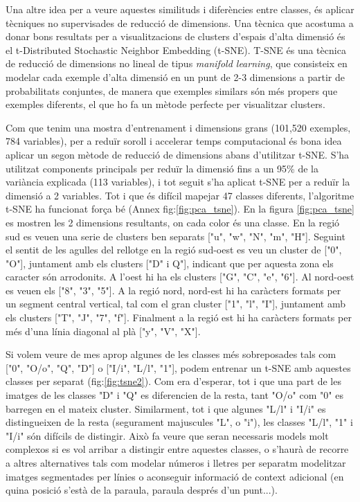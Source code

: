 \documentclass[12pt, spanish]{article}
\begin{document}
Una altre idea per a veure aquestes similituds i diferències entre classes, és aplicar tècniques no supervisades de reducció de dimensions. Una tècnica que acostuma a donar bons resultats per a visualitzacions de clusters d'espais d'alta dimensió és el t-Distributed Stochastic Neighbor Embedding (t-SNE). T-SNE és una tècnica de reducció de dimensions no lineal de tipus \textit{manifold learning}, que consisteix en modelar cada exemple d'alta dimensió en un punt de 2-3 dimensions a partir de probabilitats conjuntes, de manera que exemples similars són més propers que exemples diferents, el que ho fa un mètode perfecte per visualitzar clusters.

Com que tenim una mostra d'entrenament i dimensions grans (101,520 exemples, 784 variables), per a reduïr soroll i accelerar temps computacional és bona idea aplicar un segon mètode de reducció de dimensions abans d'utilitzar t-SNE. S'ha utilitzat components principals per reduïr la dimensió fins a un 95\% de la variància explicada (113 variables), i tot seguit s'ha aplicat t-SNE per a reduïr la dimensió a 2 variables. Tot i que és difícil mapejar 47 classes diferents, l'algoritme t-SNE ha funcionat força bé (Annex fig:\ref{fig:pca_tsne}). En la figura \ref{fig:pca_tsne} es mostren les 2 dimensions resultants, on cada color és una classe. En la regió sud es veuen una serie de clusters ben separats ["u", "w", "N", "m", "H"]. Seguint el sentit de les agulles del rellotge en la regió sud-oest es veu un cluster de ["0", "O"], juntament amb els clusters ["D" i Q"], indicant que per aquesta zona els caracter són arrodonits. A l'oest hi ha els clusters ["G", "C", "e", "6"]. Al nord-oest es veuen els ["8", "3", "5"]. A la regió nord, nord-est hi ha caràcters formats per un segment central vertical, tal com el gran cluster ["1", "l", "I"], juntament amb els clusters ["T", "J", "7", "f"]. Finalment a la regió est hi ha caràcters formats per més d'una línia diagonal al plà ["y", "V", "X"]. 

Si volem veure de mes aprop algunes de les classes més sobreposades tals com ["0", "O/o", "Q", "D"] o ["I/i", "L/l", "1"], podem entrenar un t-SNE amb aquestes classes per separat (fig:\ref{fig:tsne2}). Com era d'esperar, tot i que una part de les imatges de les classes "D" i "Q" es diferencien de la resta, tant "O/o" com "0" es barregen en el mateix cluster. Similarment, tot i que algunes "L/l" i "I/i" es distingueixen de la resta (segurament majuscules "L", o "i"), les classes "L/l", "1" i "I/i" són difícils de distingir. Això fa veure que seran necessaris models molt complexos si es vol arribar a distingir entre aquestes classes, o s'haurà de recorre a altres alternatives tals com modelar números i lletres per separatm modelitzar imatges segmentades per línies o aconseguir informació de context adicional (en quina posició s'està de la paraula, paraula després d'un punt...).
\end{document}
